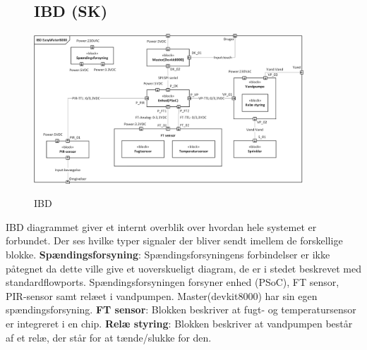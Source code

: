 \begin{figure}[H] \centering
\subsection{IBD (SK)}
{\includegraphics[width=0.9\textwidth]{filer/systemarkitektur/IBD}}
\caption{IBD}
\label{lab:ibd}
\raggedright
\end{figure}
IBD diagrammet giver et internt overblik over hvordan hele systemet er forbundet. Der ses hvilke typer signaler der bliver sendt imellem de forskellige blokke. \newline \newline
\textbf{Spændingsforsyning}: Spændingsforsyningens forbindelser er ikke påtegnet da dette ville give et uoverskueligt diagram, de er i stedet beskrevet med standardflowports. Spændingsforsyningen forsyner enhed (PSoC), FT sensor, PIR-sensor samt relæet i vandpumpen. Master(devkit8000) har sin egen spændingsforsyning.  \newline \newline
\textbf{FT sensor}: Blokken beskriver at fugt- og temperatursensor er integreret i en chip. \newline \newline
\textbf{Relæ styring}: Blokken beskriver at vandpumpen består af et relæ, der står for at tænde/slukke for den. \newline \newline

